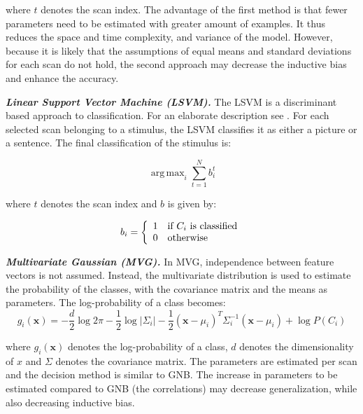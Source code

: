\documentclass[preprint,journal,11pt]{vgtc}
\begin{document}
where $t$ denotes the scan index. The advantage of the first method is that fewer parameters need to be estimated with greater amount of examples. It thus reduces the space and time complexity, and variance of the model. However, because it is likely that the assumptions of equal means and standard deviations for each scan do not hold, the second approach may decrease the inductive bias and enhance the accuracy.

\textbf{\emph{Linear Support Vector Machine (LSVM).}} The LSVM is a discriminant based approach to classification. For an elaborate description see \cite{bk:2004aplay}. For each selected scan belonging to a stimulus, the LSVM classifies it as either a picture or a sentence. The final classification of the stimulus is:

\begin{equation}
\label{eq:argmaxsvm}
\operatorname{arg\,max}_i \sum_{t=1}^{N}{b_{i}^{t}}
\end{equation}

where $t$ denotes the scan index and $b$ is given by:

\begin{equation}
b_{i} = \left\{
\begin{array}{l l}
1 \quad \text{if $C_{i}$ is classified}\\
0 \quad \text{otherwise}\\
\end{array} \right.
\end{equation}

\textbf{\emph{Multivariate Gaussian (MVG).}} In MVG, independence between feature vectors is not assumed. Instead, the multivariate distribution is used to estimate the probability of the classes, with the covariance matrix and the means as parameters. The log-probability of a class becomes:
\begin{dmath}
\label{eq:multivariate}
g_{i}(\mathbf{x}) = -\frac{d}{2}\log{2\pi}-\frac{1}{2}\log{|\Sigma_{i}|}-\frac{1}{2}(\mathbf{x}-\mu_{i})^{T}\Sigma_{i}^{-1}(\textbf{x}-\mu_{i})+\log{P(C_{i})}
\end{dmath}

where $g_{i}(\mathbf{x})$ denotes the log-probability of a class, $d$ denotes the dimensionality of $x$ and $\Sigma$ denotes the covariance matrix. The parameters are estimated per scan and the decision method is similar to GNB. The increase in parameters to be estimated compared to GNB (the correlations) may decrease generalization, while also decreasing inductive bias.
\end{document}
